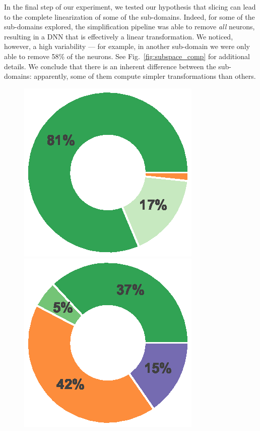 \documentclass[10pt, conference, twocolumn, compsocconf]{IEEEtran}
\theoremstyle{remark}
\begin{document}
In the final step of our experiment, we tested our hypothesis that
slicing can lead to the complete linearization of some of the
sub-domains. Indeed, for some of the sub-domains explored, the
simplification pipeline was able to remove \emph{all} neurons,
resulting in a DNN that is effectively a linear transformation. We
noticed, however, a high variability --- for example, in another
sub-domain we were only able to remove 58\% of the neurons.  See
Fig.~\ref{fig:subspace_comp} for additional details. We conclude that
there is an inherent difference between the sub-domains: apparently,
some of them compute simpler transformations than others.

\begin{figure}[htp]
\begin{center}
\includegraphics[scale=0.5]{figures/space_linear}
\includegraphics[scale=0.5]{figures/space_complex}

\end{center}
\end{figure}
\end{document}
